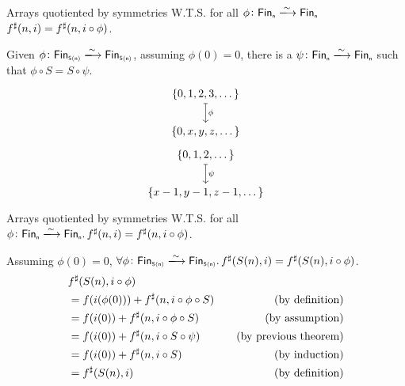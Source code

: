 \documentclass[9pt]{beamer}
\begin{document}
\begin{frame}[fragile]{Arrays quotiented by symmetries}
    W.T.S. for all $\phi\colon \Fin[n]\xto{\sim}\Fin[n]$ ${f}^{\sharp}(n, i) = {f}^{\sharp}(n, i \circ \phi)$.

    \begin{tblock}
    Given $\phi\colon \Fin[S(n)]\xto{\sim}\Fin[S(n)]$, assuming $\phi(0) = 0$, there is a 
    $\psi\colon \Fin[n]\xto{\sim}\Fin[n]$ such that $\phi \circ S = S \circ \psi$.
   
    \[\begin{tikzcd}[ampersand replacement=\&,cramped]
    	{\{0, 1, 2, 3, \dots\}} \\
    	{ \{0, x, y, z, \dots\}}
        \arrow["\phi", maps to, from=1-1, to=2-1]
    \end{tikzcd}\]

    \[\begin{tikzcd}[ampersand replacement=\&,cramped]
    	{\{0, 1, 2, \dots\}} \\
    	{ \{x - 1, y - 1, z - 1, \dots\}}
        \arrow["\psi", maps to, from=1-1, to=2-1]
    \end{tikzcd}\]

    \end{tblock}
    
\end{frame}

\begin{frame}[fragile]{Arrays quotiented by symmetries}
    W.T.S. for all $\phi\colon \Fin[n]\xto{\sim}\Fin[n]. \, \ext{f}(n, i) = \ext{f}(n, i \circ \phi)$.

    \begin{tblock}
    Assuming $\phi(0) = 0$, $\forall \phi\colon \Fin[S(n)]\xto{\sim}\Fin[S(n)]. \, \ext{f}(S(n), i) = \ext{f}(S(n), i \circ \phi)$.
    \begin{align*}
        & {f}^{\sharp}(S(n), i \circ \phi) \\
        & = f(i(\phi(0))) + {f}^{\sharp}(n, i \circ \phi \circ S) & \quad\text{(by definition)} \\
        & = f(i(0)) + {f}^{\sharp}(n, i \circ \phi \circ S)       & \quad\text{(by assumption)} \\
        & = f(i(0)) + {f}^{\sharp}(n, i \circ S \circ \psi)       & \quad\text{(by previous theorem)} \\
        & = f(i(0)) + {f}^{\sharp}(n, i \circ S)                  & \quad\text{(by induction)} \\
        & = {f}^{\sharp}(S(n), i)                                 & \quad\text{(by definition)} \\
    \end{align*}
    \end{tblock}
    
\end{frame}
\end{document}
